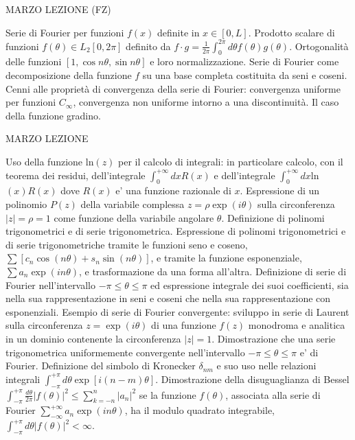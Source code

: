 \documentclass[,12pt]{article}
\begin{document}
\vskip 20pt
 MARZO
\hskip 20pt
LEZIONE (FZ)

\noindent
Serie di Fourier per funzioni $f(x)$ definite in $x \in [0,L]$.
Prodotto scalare di funzioni $f(\theta) \in L_2[0,2\pi]$ definito da
$f \cdot g = \frac{1}{2 \pi} \int_0^{2\pi} d\theta f(\theta)g(\theta)$.
Ortogonalit\`a delle funzioni $[1,\cos n \theta,\sin n\theta]$ e loro
normalizzazione. 
Serie di Fourier come decomposizione della funzione $f$ su una base
completa costituita da seni e coseni.
Cenni alle propriet\`a di convergenza della serie di Fourier: convergenza
uniforme per funzioni $C_\infty$, convergenza non uniforme intorno a una
discontinuit\`a. Il caso della funzione gradino.

\vskip 20pt
 MARZO
\hskip 20pt
LEZIONE

\noindent
Uso della funzione ln$(z)$ per il calcolo di integrali: in
particolare calcolo, con il teorema dei residui, dell'integrale
$\int_0^{+\infty}dx R(x)$ e
dell'integrale $\int_0^{+\infty}dx$ln$(x) R(x)$ dove $R(x)$ e' una
funzione razionale di $x$. Espressione di un polinomio $P(z)$ della
variabile complessa $z=\rho \exp(i\theta)$ sulla circonferenza $|z|=\rho
=1$ come funzione della variabile angolare $\theta$. Definizione di
polinomi trigonometrici e di serie trigonometrica. Espressione
di polinomi trigonometrici e di serie trigonometriche tramite
le funzioni seno e coseno, $\sum [c_n \cos(n\theta)+s_n \sin(n\theta)]$, e
tramite la funzione esponenziale, $\sum a_n\exp(in\theta)$, e
trasformazione da una forma all'altra. Definizione di serie di Fourier
nell'intervallo $-\pi\leq\theta\leq\pi$ ed espressione integrale dei suoi
coefficienti, sia nella sua rappresentazione in seni e coseni che nella
sua rappresentazione con esponenziali. Esempio di serie di Fourier
convergente: sviluppo in serie di Laurent  sulla circonferenza
$z=\exp(i\theta)$ di una funzione $f(z)$ monodroma e analitica in un
dominio contenente la circonferenza $|z|=1$. Dimostrazione che una serie
trigonometrica uniformemente convergente nell'intervallo
$-\pi\leq\theta\leq\pi$ e' di Fourier. Definizione del simbolo di
Kronecker $\delta_{nm}$ e suo uso nelle relazioni integrali
$\int_{-\pi}^{+\pi}d\theta \exp[i(n-m)\theta]$. Dimostrazione della
disuguaglianza di Bessel
$\int_{-\pi}^{+\pi}\frac{d\theta}{2\pi}|f(\theta)|^2\leq
\sum_{k=-n}^{n}|a_n|^2$ se la funzione  $f(\theta)$, associata alla
serie di Fourier $\sum_{-\infty}^{+\infty}a_n\exp(in\theta)$, ha il
modulo quadrato integrabile, $\int_{-\pi}^{+\pi}d\theta
|f(\theta)|^2<\infty$. 
   
\end{document}
